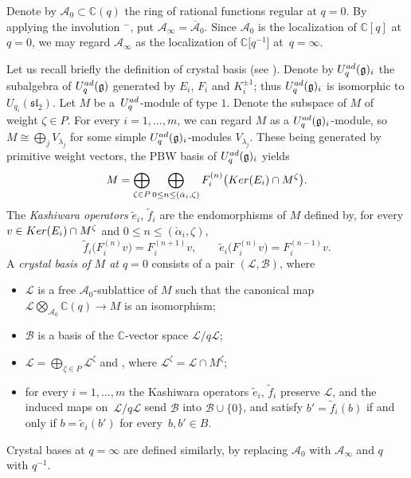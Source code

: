 \documentclass[11pt]{article}
\numberwithin{equation}{section}
\numberwithin{equation}{section}
\theoremstyle{definition}
\newcommand{\mc}{\mathbb{C}}
\newcommand{\Ll}{{\mathcal L}}
\newcommand{\ra}{\rightarrow}
\begin{document}
Denote by $\mathcal{A}_0\subset \mc(q)$ the ring of rational functions regular at $q=0$. By applying the involution ${}^-$, put $\mathcal{A}_\infty=\overline{\mathcal{A}}_0$.
Since $\mathcal{A}_0$ is the localization of $\mc[q]$ at $q=0$, we may regard $\mathcal{A}_\infty$ as the localization of $\mc\big[q^{-1}\big]$ at~${q=\infty}$.

Let us recall briefly the definition of crystal basis (see \cite{Kashiwara1}). Denote by $U_q^{\rm ad}(\mathfrak{g})_i$ the subalgebra of $U_q^{\rm ad}(\mathfrak{g})$ generated by $E_i$, $F_i$ and $K_i^{\pm 1}$; thus $U_q^{\rm ad}(\mathfrak{g})_i$ is isomorphic to $U_{q_i}({\mathfrak{sl}_2})$. Let $M$ be a~$U_q^{\rm ad}$-module of type $1$. Denote  the subspace of $M$ of weight $\zeta\in P$. For every $i=1,\dots, m$, we can regard $M$ as a $U_q^{\rm ad}(\mathfrak{g})_i$-module, so $M\cong \bigoplus_j V_{\lambda_j}$ for some simple $U_q^{\rm ad}(\mathfrak{g})_i$-modules $V_{\lambda_j}$. These being generated by primitive weight vectors, the PBW basis of $U_q^{\rm ad}(\mathfrak{g})_i$ yields
\[M = \bigoplus_{\zeta\in P} \bigoplus_{0\leq n\leq (\check{\alpha}_i, \zeta)} F_i^{(n)}\big({\rm Ker}(E_i)\cap M^\zeta\big).\]
The {\it Kashiwara operators} $\tilde{e}_i$, $\tilde{f}_i$ are the endomorphisms of $M$ defined by, for every $v\in {\rm Ker}(E_i)\cap M^\zeta$ and $0\leq n\leq (\check{\alpha}_i, \zeta)$,
\[%
\tilde{f}_i\big(F_i^{(n)}v\big) = F_i^{(n+1)}v,\qquad \tilde{e}_i\big(F_i^{(n)}v\big) = F_i^{(n-1)}v.
\]
A {\it crystal basis of $M$ at $q=0$} consists of a pair $(\Ll, \mathcal{B})$, where
\begin{itemize}\itemsep=0pt
\item $\Ll$ is a free $\mathcal{A}_0$-sublattice of $M$ such that the canonical map $\Ll \bigotimes_{\mathcal{A}_0} \mc(q) \ra M$ is an isomorphism;
\item $\mathcal{B}$ is a basis of the $\mc$-vector space $\Ll/q\Ll$;
\item $ \Ll = \bigoplus_{\zeta \in P} \Ll^\zeta$ and \smash{$\mathcal{B} = \coprod_{\zeta \in P} \big(\mathcal{B}\cap \Ll^\zeta/q\Ll^\zeta\big)$}, where $\Ll^\zeta = \Ll\cap M^\zeta$;
\item for every $i=1,\dots, m$ the Kashiwara operators $\tilde{e}_i$, $\tilde{f}_i$ preserve $\Ll$, and the induced maps on~$\Ll/q\Ll$ send $\mathcal{B}$ into $\mathcal{B}\cup \{0\}$, and satisfy $b' = \tilde{f}_i(b)$ if and only if $b=\tilde{e}_i(b')$ for every~${b,b'\in B}$.
\end{itemize}
Crystal bases at $q=\infty$ are defined similarly, by replacing $\mathcal{A}_0$ with $\mathcal{A}_\infty$ and $q$ with $q^{-1}$.
\end{document}
